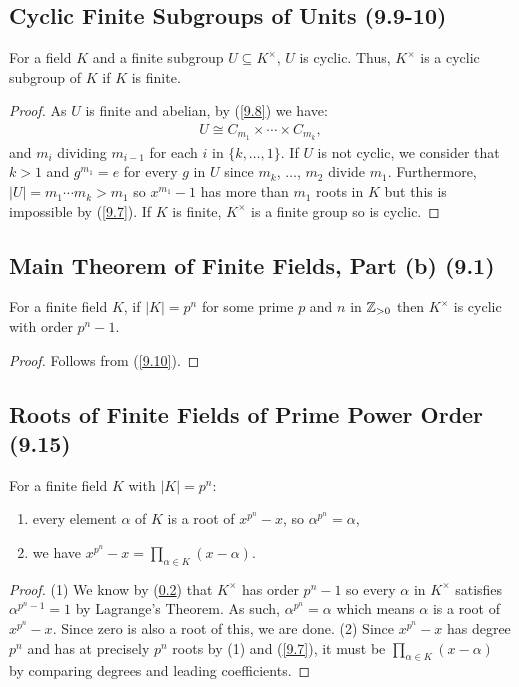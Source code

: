 \subsection{Cyclic Finite Subgroups of Units (9.9-10)} \label{9.9} \label{9.10} 

For a field $K$ and a finite subgroup $U \subseteq K^\times$, $U$ is cyclic.
Thus, $K^\times$ is a cyclic subgroup of $K$ if $K$ is finite.

\begin{proof}
    As $U$ is finite and abelian, by (\ref{9.8}) we have: \begin{align*}
        U \cong C_{m_1} \times \cdots \times C_{m_k},
    \end{align*} and $m_i$ dividing $m_{i - 1}$ for each $i$ in $\{k, \ldots, 1\}$.
    If $U$ is not cyclic, we consider that $k > 1$ and $g^{m_1} = e$ for every $g$ in $U$
    since $m_k$, $\ldots$, $m_2$ divide $m_1$. Furthermore, $|U| = m_1\cdots m_k > m_1$
    so $x^{m_1} - 1$ has more than $m_1$ roots in $K$ but this is impossible by (\ref{9.7}).
    If $K$ is finite, $K^\times$ is a finite group so is cyclic.
\end{proof}

\subsection{Main Theorem of Finite Fields, Part (b) (9.1)} \label{9.1b}

For a finite field $K$, if $|K| = p^n$ for some prime $p$ and $n$ in $\mathbb{Z}_{> 0}$ then
$K^\times$ is cyclic with order $p^n - 1$.

\begin{proof}
    Follows from (\ref{9.10}).
\end{proof}

\subsection{Roots of Finite Fields of Prime Power Order (9.15)} \label{9.15}

For a finite field $K$ with $|K| = p^n$: \begin{enumerate}
    \item every element $\alpha$ of $K$ is a root of $x^{p^n} - x$, so $\alpha^{p^n} = \alpha$,
    \item we have $x^{p^n} - x = \prod_{\alpha \in K} (x - \alpha)$.
\end{enumerate}

\begin{proof}
    (1) We know by (\ref{9.1b}) that $K^\times$ has order $p^n - 1$ so every $\alpha$ in
    $K^\times$ satisfies $\alpha^{p^n - 1} = 1$ by Lagrange's Theorem. As such,
    $\alpha^{p^n} = \alpha$ which means $\alpha$ is a root of $x^{p^n} - x$. Since zero
    is also a root of this, we are done.
    \bs
    (2) Since $x^{p^n} - x$ has degree $p^n$ and has at precisely $p^n$ roots by (1) and
    (\ref{9.7}), it must be $\prod_{\alpha \in K}(x - \alpha)$ by comparing degrees and
    leading coefficients.

\end{proof}

